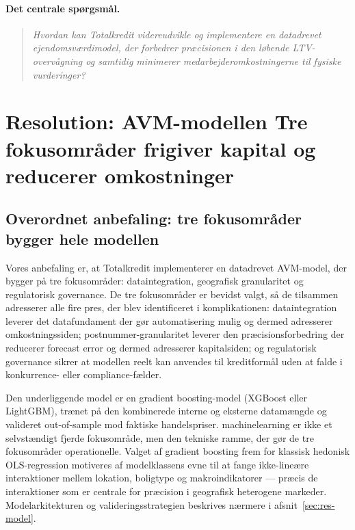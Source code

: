 \documentclass[12pt]{article}
\begin{document}
\paragraph{Det centrale spørgsmål.}
\begin{quote}
    \textit{Hvordan kan Totalkredit videreudvikle og implementere en datadrevet ejendomsværdimodel, der forbedrer præcisionen i den løbende LTV-overvågning og samtidig minimerer medarbejderomkostningerne til fysiske vurderinger?}
\end{quote}

\newpage

\section{Resolution: AVM-modellen \textbar{} Tre fokusområder frigiver kapital og reducerer omkostninger}
\label{sec:resolution}

\subsection{Overordnet anbefaling: tre fokusområder bygger hele modellen}
\label{sec:res-overblik}
Vores anbefaling er, at Totalkredit implementerer en datadrevet AVM-model, der bygger på tre fokusområder: dataintegration, geografisk granularitet og regulatorisk governance. De tre fokusområder er bevidst valgt, så de tilsammen adresserer alle fire pres, der blev identificeret i komplikationen: dataintegration leverer det datafundament der gør automatisering mulig og dermed adresserer omkostningssiden; postnummer-granularitet leverer den præcisionsforbedring der reducerer forecast error og dermed adresserer kapitalsiden; og regulatorisk governance sikrer at modellen reelt kan anvendes til kreditformål uden at falde i konkurrence- eller compliance-fælder.

Den underliggende model er en gradient boosting-model (XGBoost eller LightGBM), trænet på den kombinerede interne og eksterne datamængde og valideret out-of-sample mod faktiske handelspriser. machinelearning er ikke et selvstændigt fjerde fokusområde, men den tekniske ramme, der gør de tre fokusområder operationelle. Valget af gradient boosting frem for klassisk hedonisk OLS-regression motiveres af modelklassens evne til at fange ikke-lineære interaktioner mellem lokation, boligtype og makroindikatorer --- præcis de interaktioner som er centrale for præcision i geografisk heterogene markeder. Modelarkitekturen og valideringsstrategien beskrives nærmere i afsnit~\ref{sec:res-model}.
\end{document}
